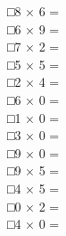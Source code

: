\documentclass[uplatex,
paper=a4,
fontsize=18pt,
jafontsize=16pt,
number_of_lines=30,
line_length=30zh,
baselineskip=25pt,
]{jlreq}
\begin{document}
\begin{multicols}{3}
□\hspace{1em}8 × 6 = 
\\

□\hspace{1em}6 × 9 = 
\\

□\hspace{1em}7 × 2 = 
\\

□\hspace{1em}5 × 5 = 
\\

□\hspace{1em}2 × 4 = 
\\

□\hspace{1em}6 × 0 = 
\\

□\hspace{1em}1 × 0 = 
\\

□\hspace{1em}3 × 0 = 
\\

□\hspace{1em}9 × 0 = 
\\

□\hspace{1em}9 × 5 = 
\\

□\hspace{1em}4 × 5 = 
\\

□\hspace{1em}0 × 2 = 
\\

□\hspace{1em}4 × 0 = 
\\

\end{multicols}
\\
\end{document}
